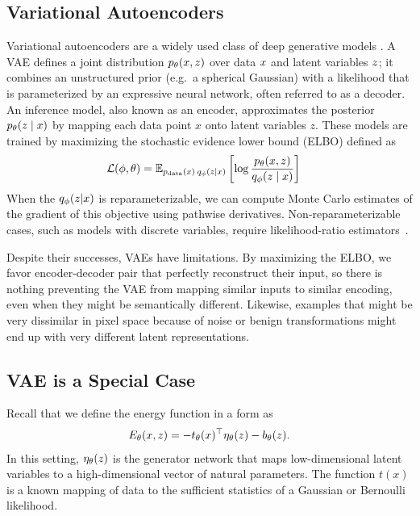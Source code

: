 \documentclass[tablecaption=bottom,wcp]{jmlr} %
\begin{document}
\subsection{Variational Autoencoders}
\vspace*{-1.5ex}
Variational autoencoders are a widely used class of deep generative models \cite{kingma2013auto-encoding, rezende2014stochastic}. A VAE defines a joint distribution $p_\theta(x, z)$ over data $x$ and latent variables $z$; it combines an unstructured prior (e.g.~a spherical Gaussian) with a likelihood that is parameterized by an expressive neural network, often referred to as a decoder. An inference model, also known as an encoder, approximates the posterior $p_\theta(z \mid x)$ by mapping each data point $x$ onto latent variables $z$. These models are trained by maximizing the stochastic evidence lower bound (ELBO) defined as
\begin{align}
    \label{eq:elbo}
    \mathcal{L} (\phi, \theta)
    &
    = 
    \mathbb{E}_{p_\text{data}(x) \: q_\phi(z \mid x)}
    \left[
      \log \frac{p_\theta(x, z)}{q_\phi(z \mid x)}
    \right] 
\end{align}
When the $q_\phi(z|x)$ is reparameterizable, we can compute Monte Carlo estimates of the gradient of this objective using pathwise derivatives. Non-reparameterizable cases, such as models with discrete variables, require likelihood-ratio estimators~\cite{williams1992simple}.

Despite their successes, VAEs have limitations. By maximizing the ELBO, we favor encoder-decoder pair that perfectly reconstruct their input, so there is nothing preventing the VAE from mapping similar inputs to similar encoding, even when they might be semantically different. Likewise, examples that might be very dissimilar in pixel space because of noise or benign transformations might end up with very different latent representations. 

\subsection{VAE is a Special Case}
Recall that we define the energy function in a form as
\begin{align}
    E_\theta(x, z) = -t_\theta(x)^\top \eta_\theta(z) - b_\theta(z).
\end{align}
In this setting, $\eta_\theta(z)$ is the generator network that maps low-dimensional latent variables to a high-dimensional vector of natural parameters. The function $t(x)$ is a known mapping of data to the sufficient statistics of a Gaussian or Bernoulli likelihood.
\end{document}
